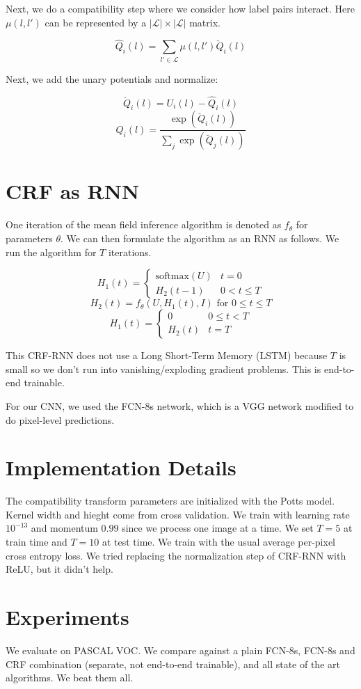\documentclass[a4paper]{article}
\begin{document}
Next, we do a compatibility step where we consider how label pairs interact.
Here $\mu(l, l')$ can be represented by a $|\mathcal{L}| \times |\mathcal{L}|$
matrix.

$$
\hat{Q}_i(l) = \sum_{l' \in \mathcal{L}}{\mu(l, l') \check{Q}_i(l)}
$$

Next, we add the unary potentials and normalize:

$$
\breve{Q}_i(l) = U_i(l) - \hat{Q}_i(l)
$$
$$
Q_i(l) = \frac{\exp(\breve{Q}_i(l))}{\sum_{j}{\exp(\breve{Q}_j(l))}}
$$

\section{CRF as RNN}
One iteration of the mean field inference algorithm is denoted as $f_\theta$
for parameters $\theta$. We can then formulate the algorithm as an RNN as
follows. We run the algorithm for $T$ iterations.

$$
H_1(t) = \begin{cases}
  \text{softmax}(U) & t = 0 \\
  H_2(t-1) & 0 < t \leq T
\end{cases}
$$
$$
H_2(t) = f_\theta(U, H_1(t), I) \text{ for $0 \leq t \leq T$}
$$
$$
H_1(t) = \begin{cases}
  0 & 0 \leq t < T \\
  H_2(t) & t = T
\end{cases}
$$

This CRF-RNN does not use a Long Short-Term Memory (LSTM) because $T$ is small
so we don't run into vanishing/exploding gradient problems. This is end-to-end
trainable.

For our CNN, we used the FCN-8s network, which is a VGG network modified to do
pixel-level predictions.

\section{Implementation Details}
The compatibility transform parameters are initialized with the Potts model.
Kernel width and hieght come from cross validation. We train with learning rate
$10^{-13}$ and momentum $0.99$ since we process one image at a time. We set
$T = 5$ at train time and $T = 10$ at test time. We train with the usual
average per-pixel cross entropy loss. We tried replacing the normalization
step of CRF-RNN with ReLU, but it didn't help.

\section{Experiments}
We evaluate on PASCAL VOC. We compare against a plain FCN-8s, FCN-8s
and CRF combination (separate, not end-to-end trainable), and all state of the
art algorithms. We beat them all.
\end{document}

